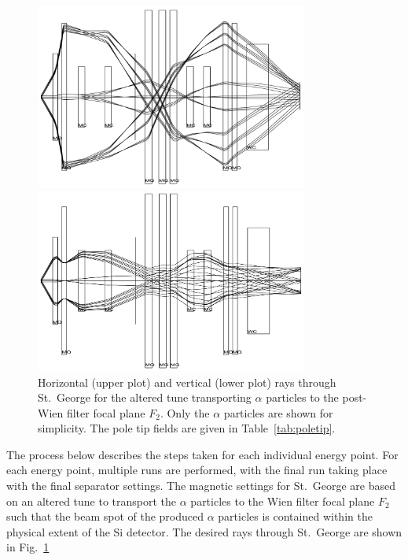 \begin{figure}
    \begin{center}
        \centerline{
            \includegraphics[width=0.8\textwidth]{figures/optimal_tune_x.png}}
        \centerline{
            \includegraphics[width=0.8\textwidth]{figures/optimal_tune_y.png}}
        \caption[Horizontal and vertical rays through St.\
            George for $\alpha$ particles]{Horizontal (upper plot) and
            vertical (lower plot) rays through St.\ George for the
            altered tune transporting $\alpha$ particles to the
            post-Wien filter focal plane $F_2$. Only the $\alpha$
            particles are shown for simplicity. The pole tip fields are
            given in Table~\ref{tab:poletip}.}
        \label{fig:raytrace-altered}
    \end{center}
\end{figure}

The process below describes the steps taken for each individual energy
point. For each energy point, multiple runs are performed, with the
final run taking place with the final separator settings. The magnetic
settings for St.\ George are based on an altered tune to transport the
$\alpha$ particles to the Wien filter focal plane $F_2$ such that the
beam spot of the produced $\alpha$ particles is contained within the
physical extent of the Si detector. The desired rays through St.\ George
are shown in Fig.~\ref{fig:raytrace-altered}

